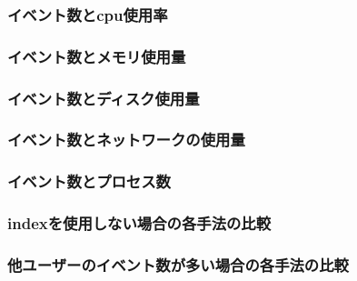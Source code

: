 \documentclass[../../main]{subfiles}
\begin{document}
    \subsubsection{イベント数とcpu使用率}\label{subsubsec:result-cpu}
    \subsubsection{イベント数とメモリ使用量}\label{subsubsec:result-memory}
    \subsubsection{イベント数とディスク使用量}\label{subsubsec:result-disk}
    \subsubsection{イベント数とネットワークの使用量}\label{subsubsec:result-network}
    \subsubsection{イベント数とプロセス数}\label{subsubsec:result-process}
    \subsubsection{indexを使用しない場合の各手法の比較}\label{subsubsec:result-without-index}
    \subsubsection{他ユーザーのイベント数が多い場合の各手法の比較}\label{subsubsec:result-other-user}

    \clearpage
\end{document}
